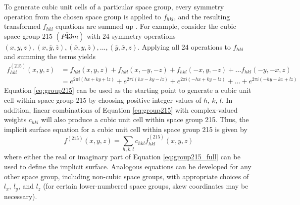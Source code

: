 \documentclass{article}
\begin{document}
To generate cubic unit cells of a particular space group, every symmetry operation from the chosen space group is applied to $f_{hkl}$, and the resulting transformed $f_{hkl}$ equations are summed up \cite{wohlgemuth2001triply}. For example, consider the cubic space group 215 $(P\overline{4}3m)$ with 24 symmetry operations $(x, y, z), (x, \overline{y}, \overline{z}), (\overline{x}, y, \overline{z}), ..., (\overline{y}, \overline{x}, z)$. Applying all 24 operations to $f_{hkl}$ and summing the terms yields
\begin{equation}
    \label{eq:group215}
    \begin{split}
        f_{hkl}^{(215)}(x, y, z) & = f_{hkl}(x, y, z) + f_{hkl}(x, -y, -z) + f_{hkl}(-x, y, -z) + ... f_{hkl}(-y, -x, z) \\
        & = e^{2\pi i \left( hx+ky+lz \right)} + e^{2\pi i \left( hx-ky-lz \right)} + e^{2\pi i \left(-hx+ky-lz \right)} + ... + e^{2\pi i \left(-hy-kx+lz \right)}
    \end{split}
\end{equation}
Equation \ref{eq:group215} can be used as the starting point to generate a cubic unit cell within space group 215 by choosing positive integer values of $h$, $k$, $l$. In addition, linear combinations of Equation \ref{eq:group215} with complex-valued weights $c_{hkl}$ will also produce a cubic unit cell within space group 215. Thus, the implicit surface equation for a cubic unit cell within space group 215 is given by
\begin{equation}
    \label{eq:group215_full}
    f^{(215)}(x, y, z) = \sum\limits_{h,k,l} c_{hkl} f_{hkl}^{(215)}(x, y, z)
\end{equation}
where either the real or imaginary part of Equation \ref{eq:group215_full} can be used to define the implicit surface. Analogous equations can be developed for any other space group, including non-cubic space groups, with appropriate choices of $l_x$, $l_y$, and $l_z$ (for certain lower-numbered space groups, skew coordinates may be necessary).
\end{document}
